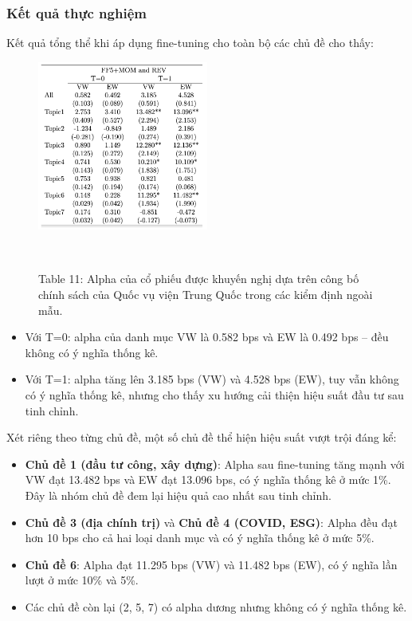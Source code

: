 \documentclass[a4paper,12pt]{article}
\begin{document}
\subsubsection{Kết quả thực nghiệm}
Kết quả tổng thể khi áp dụng fine-tuning cho toàn bộ các chủ đề cho thấy:
\begin{figure}[H]
    \centering
    \includegraphics[width=0.5\textwidth]{table/tab11.png}
    \caption*{Table 11: Alpha của cổ phiếu được khuyến nghị dựa trên công bố chính sách của Quốc vụ viện Trung Quốc trong các kiểm định ngoài mẫu.}
    \
\end{figure}
\begin{itemize}
    \item Với T=0: alpha của danh mục VW là 0.582 bps và EW là 0.492 bps – đều không có ý nghĩa thống kê.
    \item Với T=1: alpha tăng lên 3.185 bps (VW) và 4.528 bps (EW), tuy vẫn không có ý nghĩa thống kê, nhưng cho thấy xu hướng cải thiện hiệu suất đầu tư sau tinh chỉnh.
\end{itemize}

Xét riêng theo từng chủ đề, một số chủ đề thể hiện hiệu suất vượt trội đáng kể:

\begin{itemize}
    \item \textbf{Chủ đề 1 (đầu tư công, xây dựng)}: Alpha sau fine-tuning tăng mạnh với VW đạt 13.482 bps và EW đạt 13.096 bps, có ý nghĩa thống kê ở mức 1\%. Đây là nhóm chủ đề đem lại hiệu quả cao nhất sau tinh chỉnh.
    \item \textbf{Chủ đề 3 (địa chính trị)} và \textbf{Chủ đề 4 (COVID, ESG)}: Alpha đều đạt hơn 10 bps cho cả hai loại danh mục và có ý nghĩa thống kê ở mức 5\%.
    \item \textbf{Chủ đề 6}: Alpha đạt 11.295 bps (VW) và 11.482 bps (EW), có ý nghĩa lần lượt ở mức 10\% và 5\%.
    \item Các chủ đề còn lại (2, 5, 7) có alpha dương nhưng không có ý nghĩa thống kê.
\end{itemize}
\end{document}

